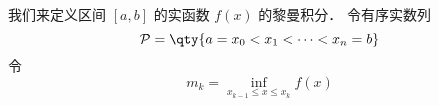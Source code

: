
我们来定义区间 $[a, b]$ 的实函数 $f(x)$ 的黎曼积分． 令有序实数列
\begin{equation}
\mathcal P = \qty{a = x_0 < x_1 < \dots < x_n = b}
\end{equation}
令
\begin{equation}
m_k = \inf_{x_{k-1} \le x \le x_k} f(x)
\end{equation}

